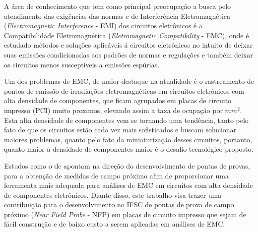 A área de conhecimento que tem como principal preocupação a busca pelo atendimento das exigências das normas e de Interferência Eletromagnética (\textit{Electromagnetic Interference} - EMI) dos circuitos eletrônicos é a Compatibilidade Eletromagnética (\textit{Eletromagnetic Compatibility} - EMC), onde é estudado métodos e soluções aplicáveis á circuitos eletrônicos no intuito de deixar suas emissões condicionadas aos padrões de normas e regulações e também deixar os circuitos menos susceptíveis a emissões espúrias.

Um dos problemas de EMC, de maior destaque na atualidade é o rastreamento de pontos de emissão de irradiações eletromagnéticas em circuitos eletrônicos com alta densidade de componentes, que ficam agrupados em placas de circuito impresso (PCI) muito proximos, elevando assim a taxa de ocupação por $mm^2$. Esta alta densidade de componentes vem se tornando uma tendência, tanto pelo fato de que os circuitos estão cada vez mais sofisticados e buscam solucionar maiores problemas, quanto pelo fato da miniaturização desses circuitos, portanto, quanto maior a densidade de componentes maior é o desafio tecnológico proposto.




Estudos como o de \cite{sivaraman2017} apontam na direção do desenvolvimento de pontas de provas, para a obtenção de medidas de campo próximo afim de proporcionar uma ferramenta mais adequada para análises de EMC em circuitos com alta densidade de componentes eletrônicos. Diante disso, este trabalho visa trazer uma contribuição para o desenvolvimento no IFSC de pontas de prova de campo próximo (\textit{Near Field Probe} - NFP) em placas de circuito impresso que sejam de fácil construção e de baixo custo a serem aplicadas em análises de EMC.

